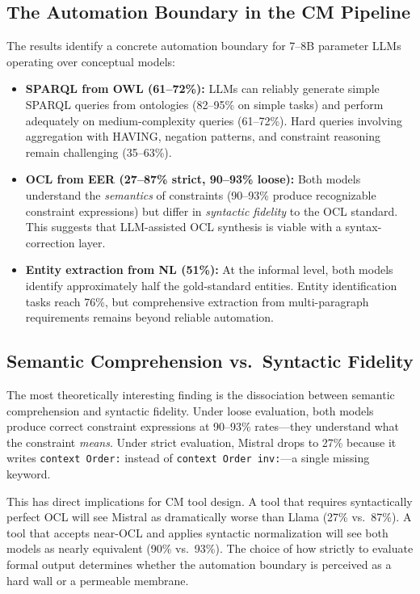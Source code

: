 \documentclass[runningheads]{llncs}
\begin{document}
\subsection{The Automation Boundary in the CM Pipeline}

The results identify a concrete automation boundary for 7--8B parameter LLMs operating over conceptual models:

\begin{itemize}[noitemsep]
  \item \textbf{SPARQL from OWL (61--72\%):} LLMs can reliably generate simple SPARQL queries from ontologies (82--95\% on simple tasks) and perform adequately on medium-complexity queries (61--72\%). Hard queries involving aggregation with HAVING, negation patterns, and constraint reasoning remain challenging (35--63\%).
  \item \textbf{OCL from EER (27--87\% strict, 90--93\% loose):} Both models understand the \emph{semantics} of constraints (90--93\% produce recognizable constraint expressions) but differ in \emph{syntactic fidelity} to the OCL standard. This suggests that LLM-assisted OCL synthesis is viable with a syntax-correction layer.
  \item \textbf{Entity extraction from NL (51\%):} At the informal level, both models identify approximately half the gold-standard entities. Entity identification tasks reach 76\%, but comprehensive extraction from multi-paragraph requirements remains beyond reliable automation.
\end{itemize}

\subsection{Semantic Comprehension vs.\ Syntactic Fidelity}

The most theoretically interesting finding is the dissociation between semantic comprehension and syntactic fidelity. Under loose evaluation, both models produce correct constraint expressions at 90--93\% rates---they understand what the constraint \emph{means}. Under strict evaluation, Mistral drops to 27\% because it writes \texttt{context~Order:} instead of \texttt{context~Order~inv:}---a single missing keyword.

This has direct implications for CM tool design. A tool that requires syntactically perfect OCL will see Mistral as dramatically worse than Llama (27\% vs.\ 87\%). A tool that accepts near-OCL and applies syntactic normalization will see both models as nearly equivalent (90\% vs.\ 93\%). The choice of how strictly to evaluate formal output determines whether the automation boundary is perceived as a hard wall or a permeable membrane.
\end{document}
